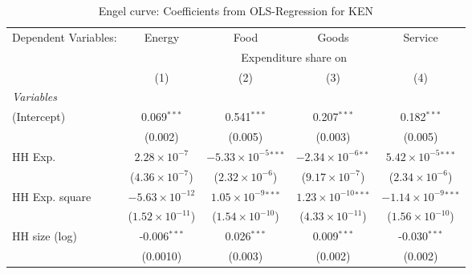 
\begin{table}[htbp!]
   \centering
   \small
   \begin{adjustbox}{width = 1\textwidth, max height = 0.95\textheight, center}
      \begin{threeparttable}[b]
         \caption{\label{tab:Engel_parametric_KEN} Engel curve: Coefficients from OLS-Regression for KEN}
         \begin{tabular}{lcccc}
            \tabularnewline \midrule \midrule
            Dependent Variables: & Energy                   & Food                           & Goods                          & Service\\  
             & \multicolumn{4}{c}{Expenditure share on} \\ 
                                 & (1)                      & (2)                            & (3)                            & (4)\\  
            \midrule
            \emph{Variables}\\
            (Intercept)          & 0.069$^{***}$            & 0.541$^{***}$                  & 0.207$^{***}$                  & 0.182$^{***}$\\   
                                 & (0.002)                  & (0.005)                        & (0.003)                        & (0.005)\\   
            HH Exp.              & $2.28\times 10^{-7}$     & $-5.33\times 10^{-5}$$^{***}$  & $-2.34\times 10^{-6}$$^{**}$   & $5.42\times 10^{-5}$$^{***}$\\    
                                 & ($4.36\times 10^{-7}$)   & ($2.32\times 10^{-6}$)         & ($9.17\times 10^{-7}$)         & ($2.34\times 10^{-6}$)\\    
            HH Exp. square       & $-5.63\times 10^{-12}$   & $1.05\times 10^{-9}$$^{***}$   & $1.23\times 10^{-10}$$^{***}$  & $-1.14\times 10^{-9}$$^{***}$\\    
                                 & ($1.52\times 10^{-11}$)  & ($1.54\times 10^{-10}$)        & ($4.33\times 10^{-11}$)        & ($1.56\times 10^{-10}$)\\    
            HH size (log)        & -0.006$^{***}$           & 0.026$^{***}$                  & 0.009$^{***}$                  & -0.030$^{***}$\\   
                                 & (0.0010)                 & (0.003)                        & (0.002)                        & (0.002)\\   
            \midrule 

\end{tabular}
\end{threeparttable}
\end{adjustbox}
\end{table}
